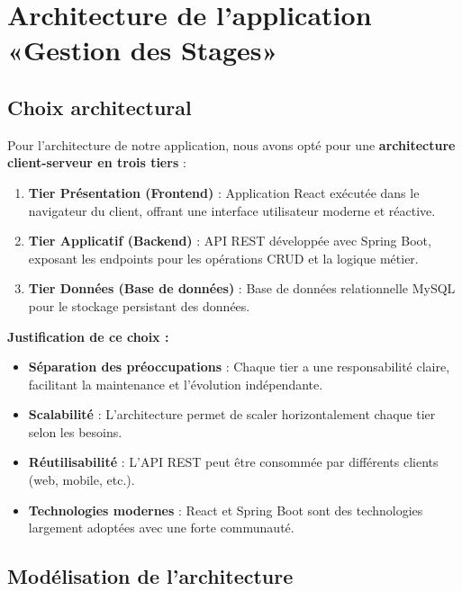 \documentclass[12pt,a4paper]{report}
\begin{document}
\section{Architecture de l'application «Gestion des Stages»}

\subsection{Choix architectural}

Pour l'architecture de notre application, nous avons opté pour une \textbf{architecture client-serveur en trois tiers} :

\begin{enumerate}[leftmargin=1cm]
    \item \textbf{Tier Présentation (Frontend)} : Application React exécutée dans le navigateur du client, offrant une interface utilisateur moderne et réactive.
    
    \item \textbf{Tier Applicatif (Backend)} : API REST développée avec Spring Boot, exposant les endpoints pour les opérations CRUD et la logique métier.
    
    \item \textbf{Tier Données (Base de données)} : Base de données relationnelle MySQL pour le stockage persistant des données.
\end{enumerate}

\textbf{Justification de ce choix :}

\begin{itemize}[leftmargin=1cm]
    \item \textbf{Séparation des préoccupations} : Chaque tier a une responsabilité claire, facilitant la maintenance et l'évolution indépendante.
    
    \item \textbf{Scalabilité} : L'architecture permet de scaler horizontalement chaque tier selon les besoins.
    
    \item \textbf{Réutilisabilité} : L'API REST peut être consommée par différents clients (web, mobile, etc.).
    
    \item \textbf{Technologies modernes} : React et Spring Boot sont des technologies largement adoptées avec une forte communauté.
\end{itemize}

\subsection{Modélisation de l'architecture}
\end{document}
